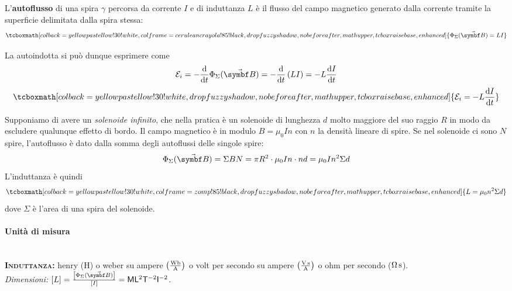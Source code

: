 \begin{define}[Autoflusso]
	L'\textbf{autoflusso} di una spira $\gamma$ percorsa da corrente $I$ e di induttanza $L$ è il flusso del campo magnetico generato dalla corrente tramite la superficie delimitata dalla spira stessa:
	\begin{equation}
		\tcboxmath[colback=yellowpastellow!30!white,colframe=ceruleancrayola!85!black,drop fuzzy shadow, nobeforeafter, math upper, tcbox raise base, enhanced]{\Phi_{\Sigma}(\vba{B})=LI}
	\end{equation}
\end{define}
La \fem autoindotta si può dunque esprimere come
\begin{equation*}
	\mathcal{E}_i=-\dv{t}\Phi_{\Sigma}(\vba{B})=-\dv{t}\left(LI\right)=-L\dv{I}{t}
\end{equation*}
\begin{equation}
	\tcboxmath[colback=yellowpastellow!30!white,drop fuzzy shadow, nobeforeafter, math upper, tcbox raise base, enhanced]{\mathcal{E}_i=-L\dv{I}{t}}
\end{equation}
\begin{examplewt}
	Supponiamo di avere un \textit{solenoide infinito}, che nella pratica è un solenoide di lunghezza $d$ molto maggiore del suo raggio $R$ in modo da escludere qualunque effetto di bordo. Il campo magnetico è in modulo $B=\mu_0 I n$ con $n$ la densità lineare di spire. Se nel solenoide ci sono $N$ spire, l'autoflusso è dato dalla somma degli autoflussi delle singole spire:
	\begin{equation*}
		\Phi_{\Sigma}(\vba{B})=\Sigma B N=\pi R^2 \cdot \mu_0 I n \cdot nd=\mu_0 I n^2\Sigma d
	\end{equation*}
	L'induttanza è quindi
	\begin{equation}
		\tcboxmath[colback=yellowpastellow!30!white,colframe=zomp!85!black,drop fuzzy shadow, nobeforeafter, math upper, tcbox raise base, enhanced]{L=\mu_0 n^2\Sigma d}
	\end{equation}
	dove $\Sigma$ è l'area di una spira del solenoide.
\end{examplewt}
\paragraph{Unità di misura}
\begin{units}~\\
	\textbf{\textsc{Induttanza:}} henry ($\unit{\henry}$) o weber su ampere  $\left(\unit[per-mode = fraction]{\weber\per\ampere}\right)$ o volt per secondo su ampere $\left(\unit[per-mode = fraction]{\volt\second\per\ampere}\right)$ o ohm per secondo ($\unit[per-mode = fraction]{\ohm\second}$).\\
	\textit{Dimensioni:} $[L]=\frac{\left[\Phi_{\Sigma}(\vba{B})\right]}{\left[I\right]}=\mathsf{M} \mathsf{L}^2 \mathsf{T}^{-2} \mathsf{I}^{-2}$.
\end{units}
